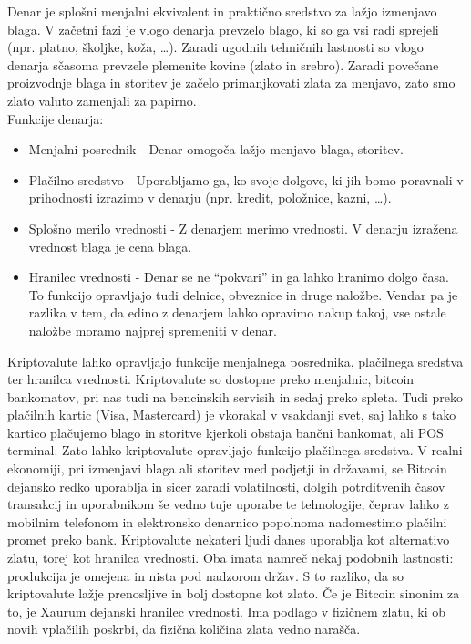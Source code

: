\documentclass[letterpaper, titlepage, freqn]{article}
\begin{document}
Denar je splošni menjalni ekvivalent in praktično sredstvo za lažjo izmenjavo blaga. V začetni fazi je vlogo denarja prevzelo blago, ki so ga vsi radi sprejeli (npr. platno, školjke, koža, …). Zaradi ugodnih tehničnih lastnosti so vlogo denarja sčasoma prevzele plemenite kovine (zlato in srebro). Zaradi povečane proizvodnje blaga in storitev je začelo primanjkovati zlata za menjavo, zato smo zlato valuto zamenjali za papirno.\\
Funkcije denarja:
\begin{itemize}
\item Menjalni posrednik - Denar omogoča lažjo menjavo blaga, storitev.
\item Plačilno sredstvo - Uporabljamo ga, ko svoje dolgove, ki jih bomo poravnali v prihodnosti izrazimo v denarju (npr. kredit, položnice, kazni, …).
\item Splošno merilo vrednosti - Z denarjem merimo vrednosti. V denarju izražena vrednost blaga je cena blaga.
\item Hranilec vrednosti - Denar se ne “pokvari” in ga lahko hranimo dolgo časa. To funkcijo opravljajo tudi delnice, obveznice in druge naložbe. Vendar pa je razlika v tem, da edino z denarjem lahko opravimo nakup takoj, vse ostale naložbe moramo najprej spremeniti v denar.
\end{itemize}
Kriptovalute lahko opravljajo funkcije menjalnega posrednika, plačilnega sredstva ter hranilca vrednosti. Kriptovalute so dostopne preko menjalnic, bitcoin bankomatov, pri nas tudi na bencinskih servisih in sedaj preko spleta. Tudi preko plačilnih kartic (Visa, Mastercard) je vkorakal v vsakdanji svet, saj lahko s tako kartico plačujemo blago in storitve kjerkoli obstaja bančni bankomat, ali POS terminal. Zato lahko kriptovalute opravljajo funkcijo plačilnega sredstva. V realni ekonomiji, pri izmenjavi blaga ali storitev med podjetji in državami, se Bitcoin dejansko redko uporablja in sicer zaradi volatilnosti, dolgih potrditvenih časov transakcij in uporabnikom še vedno tuje uporabe te tehnologije, čeprav lahko z mobilnim telefonom in elektronsko denarnico popolnoma nadomestimo plačilni promet preko bank.
Kriptovalute nekateri ljudi danes uporablja kot alternativo zlatu, torej kot hranilca vrednosti. Oba imata namreč nekaj podobnih lastnosti: produkcija je omejena in nista pod nadzorom držav. S to razliko, da so kriptovalute lažje prenosljive in bolj dostopne kot zlato. Če je Bitcoin sinonim za to, je Xaurum dejanski hranilec vrednosti. Ima podlago v fizičnem zlatu, ki ob novih vplačilih poskrbi, da fizična količina zlata vedno narašča.\\
\end{document}
